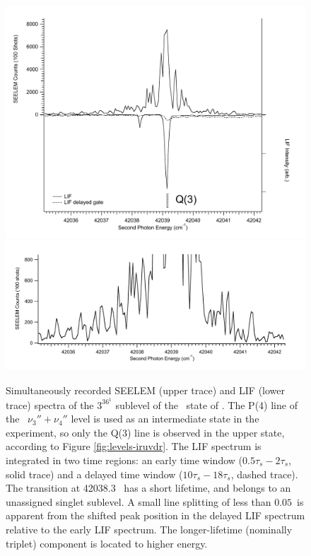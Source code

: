 \documentclass[12pt]{mitthesis}
\begin{document}
\begin{figure}
  \caption{Simultaneously recorded SEELEM (upper trace) and LIF (lower
    trace) spectra of the $3^36^1$  sublevel of the \astate\
    state of .  The P(4) line of the \xstate\ $\nu_3'' +
    \nu_4''$ level is used as an intermediate state in the experiment,
    so only the Q(3) line is observed in the upper state, according to
    Figure \ref{fig:levels-iruvdr}.  The LIF spectrum is integrated in
    two time regions: an early time window ($0.5\tau_s-2\tau_s$, solid
    trace) and a delayed time window ($10\tau_s-18\tau_s$, dashed
    trace).  The transition at 42038.3 \rcm\ has a short lifetime, and
    belongs to an unassigned singlet sublevel.  A small line splitting
    of less than $0.05$\rcm\ is apparent from the shifted peak
    position in the delayed LIF spectrum relative to the early LIF
    spectrum.  The longer-lifetime (nominally triplet) component is
    located to higher energy.}
  \label{fig:3361-q3}
  \centering
  \includegraphics[width=6in]{spectrum-3361-q3-split.pdf}
  \includegraphics[width=6in]{spectrum-3361-q3-zoom.pdf}
\end{figure}
\end{document}

